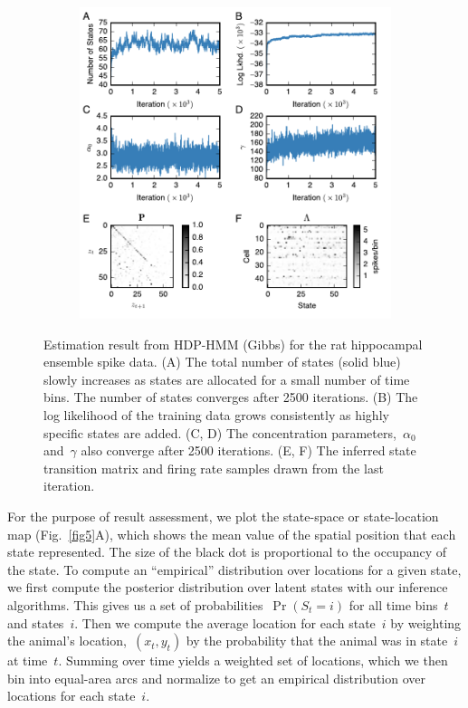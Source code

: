 \begin{figure}
  \centering
  \begin{subfigure}[t]{5.0in}
    \includegraphics[width=\textwidth]{figures/ch5/Fig6}
  \end{subfigure}
  \caption[Inferred parameters of the HDP-HMM for hippocampal
    data]{Estimation result from HDP-HMM (Gibbs) for the rat
    hippocampal ensemble spike data. (A) The total number of states
    (solid blue) slowly increases as states are allocated for a small
    number of time bins. The number of states converges after 2500
    iterations. (B) The log likelihood of the training data grows
    consistently as highly specific states are added. (C, D) The
    concentration parameters,~$\alpha_0$ and~$\gamma$ also converge
    after 2500 iterations. (E, F) The inferred state transition matrix
    and firing rate samples drawn from the last iteration.  }
  \label{fig6}
\end{figure}

For the purpose of result assessment, we plot the state-space or
state-location map (Fig.~\ref{fig5}A), which shows the mean value of
the spatial position that each state represented. The size of the
black dot is proportional to the occupancy of the state.  To compute
an ``empirical'' distribution over locations for a given state, we
first compute the posterior distribution over latent states with our
inference algorithms. This gives us a set of
probabilities~$\Pr(S_t=i)$ for all time bins~$t$ and states~$i$. Then
we compute the average location for each state~$i$ by weighting the
animal's location,~$(x_t,y_t)$ by the probability that the animal was
in state~$i$ at time~$t$. Summing over time yields a weighted set of
locations, which we then bin into equal-area arcs and normalize to get
an empirical distribution over locations for each state~$i$.

